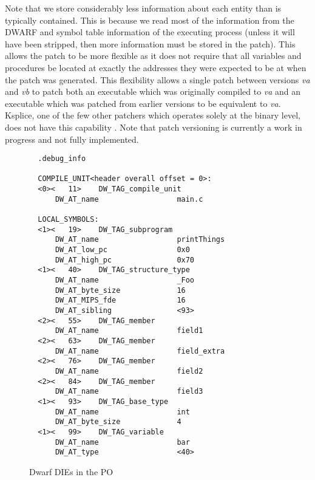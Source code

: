 Note that we store considerably less information about each entity
than is typically contained. This is because we read most of the
information from the DWARF and symbol table information of the
executing process (unless it will have been stripped, then more
information must be stored in the patch). This allows the patch to be
more flexible as it does not require that all variables and procedures
be located at exactly the addresses they were expected to be at when
the patch was generated. This flexibility allows a single patch
between versions \emph{va} and \emph{vb} to patch both an executable
which was originally compiled to \emph{va} and an executable which was
patched from earlier versions to be equivalent to \emph{va}. Ksplice,
one of the few other patchers which operates solely at the binary
level, does not have this capability \cite{ksplice}. Note that patch
versioning is currently a work in progress and not fully implemented.
\begin{figure}[ht]
{\small
\begin{center}
\begin{verbatim}
  .debug_info

  COMPILE_UNIT<header overall offset = 0>:
  <0><   11>	DW_TAG_compile_unit
      DW_AT_name                  main.c

  LOCAL_SYMBOLS:
  <1><   19>	DW_TAG_subprogram
      DW_AT_name                  printThings
      DW_AT_low_pc                0x0
      DW_AT_high_pc               0x70
  <1><   40>	DW_TAG_structure_type
      DW_AT_name                  _Foo
      DW_AT_byte_size             16
      DW_AT_MIPS_fde              16
      DW_AT_sibling               <93>
  <2><   55>	DW_TAG_member
      DW_AT_name                  field1
  <2><   63>	DW_TAG_member
      DW_AT_name                  field_extra
  <2><   76>	DW_TAG_member
      DW_AT_name                  field2
  <2><   84>	DW_TAG_member
      DW_AT_name                  field3
  <1><   93>	DW_TAG_base_type
      DW_AT_name                  int
      DW_AT_byte_size             4
  <1><   99>	DW_TAG_variable
      DW_AT_name                  bar
      DW_AT_type                  <40>
\end{verbatim}
\end{center}
}
\caption{Dwarf DIEs in the PO}
\label{fig:dies}
\vspace{-10pt}
\end{figure}

